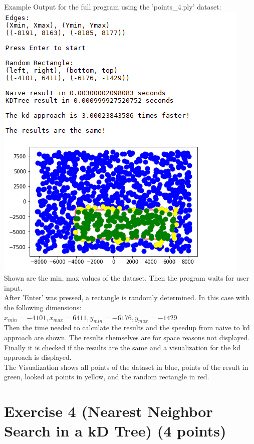 \documentclass[english, fontsize=12pt, paper=a4, twoside=false, draft=true, pagesize=auto, version=last, DIV=16]{scrartcl}
\theoremstyle{break}
\begin{document}
\newpage

Example Output for the full program using the 'points\_4.ply' dataset:\\
\includegraphics{./images/task3.png}\\
Shown are the min, max values of the dataset. Then the program waits for user input.\\
After 'Enter' was pressed, a rectangle is randomly determined. In this case with the following dimensions:\\
$x_{min}=-4101, x_{max}=6411, y_{min}=-6176, y_{max}=-1429$\\
Then the time needed to calculate the results and the speedup from naive to kd approach are shown. The results themselves are for space reasons not displayed.\\
Finally it is checked if the results are the same and a visualization for the kd approach is displayed.\\
The Visualization shows all points of the dataset in blue, points of the result in green, looked at points in yellow, and the random rectangle in red.


\newpage

\section*{\large Exercise 4 (Nearest Neighbor Search in a kD Tree) {\normalsize \hfill (4 points)}}
\end{document}
